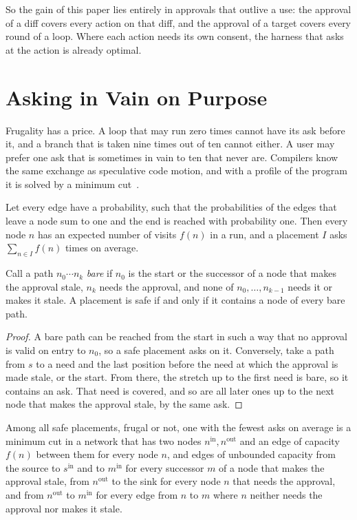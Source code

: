 \documentclass[acmsmall,nonacm,screen]{acmart}
\begin{document}
So the gain of this paper lies entirely in approvals that outlive a use: the approval of a
diff covers every action on that diff, and the approval of a target covers every round of a
loop. Where each action needs its own consent, the harness that asks at the action is
already optimal.

\section{Asking in Vain on Purpose}
\label{sec:cut}

Frugality has a price. A loop that may run zero times cannot have its ask before it, and a
branch that is taken nine times out of ten cannot either. A user may prefer one ask that
is sometimes in vain to ten that never are. Compilers know the same exchange as speculative
code motion, and with a profile of the program it is solved by a minimum
cut~\cite{cai2003,xue2006}.

Let every edge have a probability, such that the probabilities of the edges that leave a
node sum to one and the end is reached with probability one. Then every node $n$ has an
expected number of visits $f(n)$ in a run, and a placement $I$ asks $\sum_{n \in I} f(n)$
times on average.

\begin{lemma}
\label{lem:bare}
Call a path $n_0 \cdots n_k$ \emph{bare} if $n_0$ is the start or the successor of a node
that makes the approval stale, $n_k$ needs the approval, and none of $n_0, \ldots, n_{k-1}$
needs it or makes it stale. A placement is safe if and only if it contains a node of every
bare path.
\end{lemma}

\begin{proof}
A bare path can be reached from the start in such a way that no approval is valid on entry
to $n_0$, so a safe placement asks on it. Conversely, take a path from $s$ to a need and
the last position before the need at which the approval is made stale, or the start. From
there, the stretch up to the first need is bare, so it contains an ask. That need is
covered, and so are all later ones up to the next node that makes the approval stale, by
the same ask.
\end{proof}

\begin{theorem}
\label{thm:cut}
Among all safe placements, frugal or not, one with the fewest asks on average is a minimum
cut in a network that has two nodes $n^{\mathrm{in}}, n^{\mathrm{out}}$ and an edge of
capacity $f(n)$ between them for every node $n$, and edges of unbounded capacity from the
source to $s^{\mathrm{in}}$ and to $m^{\mathrm{in}}$ for every successor $m$ of a node that
makes the approval stale, from $n^{\mathrm{out}}$ to the sink for every node $n$ that needs
the approval, and from $n^{\mathrm{out}}$ to $m^{\mathrm{in}}$ for every edge from $n$ to
$m$ where $n$ neither needs the approval nor makes it stale.
\end{theorem}
\end{document}
